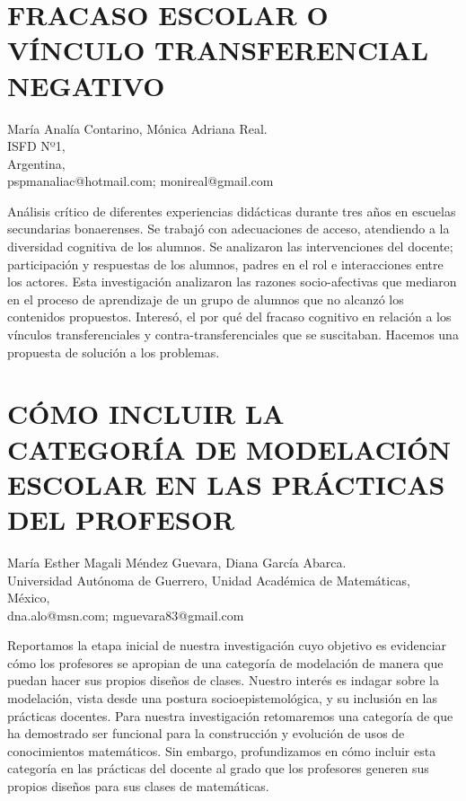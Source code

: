 \section{\uppercase{ Fracaso escolar o vínculo transferencial negativo} }

\begin{datos}
María Analía Contarino, Mónica Adriana Real. \\
ISFD Nº1,\\
\hfill Argentina, \\
 \hfill pspmanaliac@hotmail.com;  monireal@gmail.com 
\end{datos}

Análisis crítico de diferentes experiencias didácticas durante tres
años en escuelas secundarias bonaerenses. Se trabajó con adecuaciones
de acceso, atendiendo a la diversidad cognitiva de los alumnos. Se
analizaron las intervenciones del docente; participación y respuestas
de los alumnos, padres en el rol e interacciones entre los actores.
Esta investigación analizaron las razones socio-afectivas que mediaron
en el proceso de aprendizaje de un grupo de alumnos que no alcanzó
los contenidos propuestos. Interesó, el por qué del fracaso cognitivo
en relación a los vínculos transferenciales y contra-transferenciales
que se suscitaban. Hacemos una propuesta de solución a los problemas.


\section{CÓMO INCLUIR LA CATEGORÍA DE MODELACIÓN ESCOLAR EN LAS PRÁCTICAS
DEL PROFESOR}

\begin{datos}
María Esther Magali Méndez Guevara, Diana García Abarca. \\
Universidad Autónoma de Guerrero, Unidad Académica de Matemáticas,\\
\hfill México, \\
 \hfill dna.alo@msn.com; mguevara83@gmail.com 
\end{datos}

Reportamos la etapa inicial de nuestra investigación cuyo objetivo
es evidenciar cómo los profesores se apropian de una categoría de
modelación de manera que puedan hacer sus propios diseños de clases.
Nuestro interés es indagar sobre la modelación, vista desde una postura
socioepistemológica, y su inclusión en las prácticas docentes. Para
nuestra investigación retomaremos una categoría de que ha demostrado
ser funcional para la construcción y evolución de usos de conocimientos
matemáticos. Sin embargo, profundizamos en cómo incluir esta categoría
en las prácticas del docente al grado que los profesores generen sus
propios diseños para sus clases de matemáticas. 


